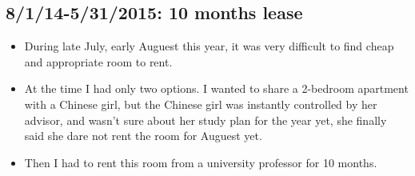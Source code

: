 \documentclass[9pt,b5paper]{article}
\begin{document}
\subsection{8/1/14-5/31/2015: 10 months lease}
\label{sec-2-3}
\begin{itemize}
\item During late July, early Auguest this year, it was very difficult to find cheap and appropriate room to rent.
\item At the time I had only two options. I wanted to share a 2-bedroom apartment with a Chinese girl, but the Chinese girl was instantly controlled by her advisor, and wasn't sure about her study plan for the year yet, she finally said she dare not rent the room for Auguest yet.
\item Then I had to rent this room from a university professor for 10 months.
\end{itemize}
\end{document}
